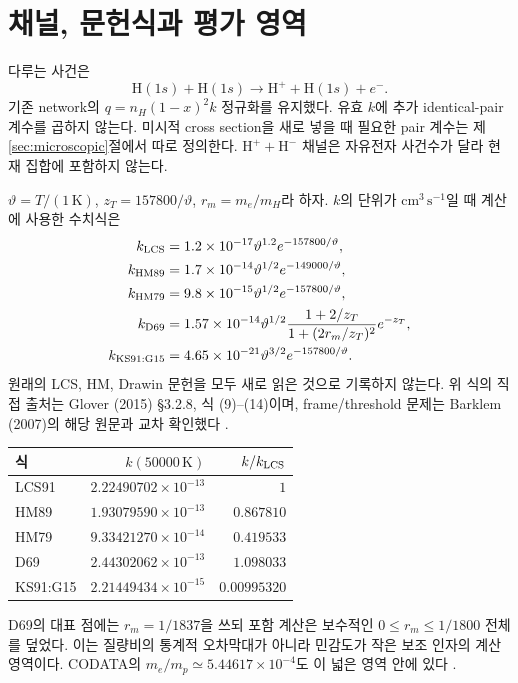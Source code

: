 \documentclass[11pt,a4paper]{article}
\begin{document}
\newpage
\section{채널, 문헌식과 평가 영역}
다루는 사건은
\begin{equation}
\mathrm H(1s)+\mathrm H(1s)\longrightarrow\mathrm H^++\mathrm H(1s)+e^-.
\end{equation}
기존 network의 $q=n_H(1-x)^2k$ 정규화를 유지했다. 유효 $k$에 추가 identical-pair 계수를 곱하지 않는다. 미시적 cross section을 새로 넣을 때 필요한 pair 계수는 제\ref{sec:microscopic}절에서 따로 정의한다. $\mathrm H^++\mathrm H^-$ 채널은 자유전자 사건수가 달라 현재 집합에 포함하지 않는다.

$\vartheta=T/(1\,\mathrm K)$, $z_T=157800/\vartheta$, $r_m=m_e/m_H$라 하자. $k$의 단위가 $\mathrm{cm^3\,s^{-1}}$일 때 계산에 사용한 수치식은 \cite{glover}
\begin{align}
k_{\rm LCS}&=1.2\times10^{-17}\vartheta^{1.2}e^{-157800/\vartheta},\\
k_{\rm HM89}&=1.7\times10^{-14}\vartheta^{1/2}e^{-149000/\vartheta},\\
k_{\rm HM79}&=9.8\times10^{-15}\vartheta^{1/2}e^{-157800/\vartheta},\\
k_{\rm D69}&=1.57\times10^{-14}\vartheta^{1/2}
 \frac{1+2/z_T}{1+(2r_m/z_T)^2}e^{-z_T},\\
k_{\rm KS91:G15}&=4.65\times10^{-21}\vartheta^{3/2}e^{-157800/\vartheta}.
\end{align}
원래의 LCS, HM, Drawin 문헌을 모두 새로 읽은 것으로 기록하지 않는다. 위 식의 직접 출처는 Glover (2015) \S3.2.8, 식 (9)--(14)이며, frame/threshold 문제는 Barklem (2007)의 해당 원문과 교차 확인했다 \cite{barklem}.

\begin{center}\begin{tabular}{@{}lrr@{}}\toprule
식 & $k(50000\,\mathrm K)$ & $k/k_{\rm LCS}$\\\midrule
LCS91 & $2.22490702\times10^{-13}$ & $1$\\
HM89 & $1.93079590\times10^{-13}$ & $0.867810$\\
HM79 & $9.33421270\times10^{-14}$ & $0.419533$\\
D69 & $2.44302062\times10^{-13}$ & $1.098033$\\
KS91:G15 & $2.21449434\times10^{-15}$ & $0.00995320$\\\bottomrule
\end{tabular}\end{center}
D69의 대표 점에는 $r_m=1/1837$을 쓰되 포함 계산은 보수적인 $0\le r_m\le1/1800$ 전체를 덮었다. 이는 질량비의 통계적 오차막대가 아니라 민감도가 작은 보조 인자의 계산 영역이다. CODATA의 $m_e/m_p\simeq5.44617\times10^{-4}$도 이 넓은 영역 안에 있다 \cite{nist}.
\end{document}
